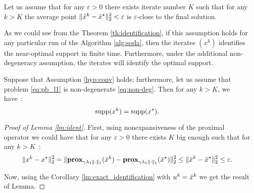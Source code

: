 \begin{assumption}[On convergence]\label{hyp:conv}
Let us assume that for any $\varepsilon > 0$ there exists iterate number $K$ such that for any $k>K$ the average point $\|\bar{x}^k-\bar{x}^{\star}\|_2^2<\varepsilon$ is $\varepsilon$-close to the final solution.
\end{assumption}

As we could see from the Theorem \ref{th:identification}, if this assumption holds for any particular run of the Algorithm \ref{alg:soda}, then the iterates $(x^k)$ identifies the near-optimal support in finite time. Furthermore, under the additional non-degeneracy assumption, the iterates will identify the optimal support. 

\begin{lemma}[Identification]\label{lm:ident}
Suppose that Assumption \ref{hyp:conv} holds; furthermore, let us assume that problem \eqref{eq:pb_l1} is non-degenerate \eqref{eq:non-deg}. 
Then for any $k>K$, we have~:
\begin{equation}
    \mathrm{supp} (x^k) = \mathrm{supp}(x^\star).
\end{equation}
\end{lemma}
\begin{proof}[Proof of Lemma \ref{lm:ident}]
First, using nonexpansiveness of the proximal operator we could have that for any $\varepsilon>0$ there exists $K$ big enough such that for any $k>K$~:
\[
\|x^k-x^\star\|_2^2 = \|\mathbf{prox}_{\gamma \lambda_1\|\cdot\|_1}(\bar{x}^k)-\mathbf{prox}_{\gamma \lambda_1\|\cdot\|_1}(\bar{x}^\star)\|_2^2\leq\|\bar{x}^k-\bar{x}^\star\|_2^2\leq\varepsilon.
\] 

Now, using the Corollary \ref{lm:exact_identification} with $u^k = \bar{x}^k$ we get the result of Lemma.


\end{proof}


